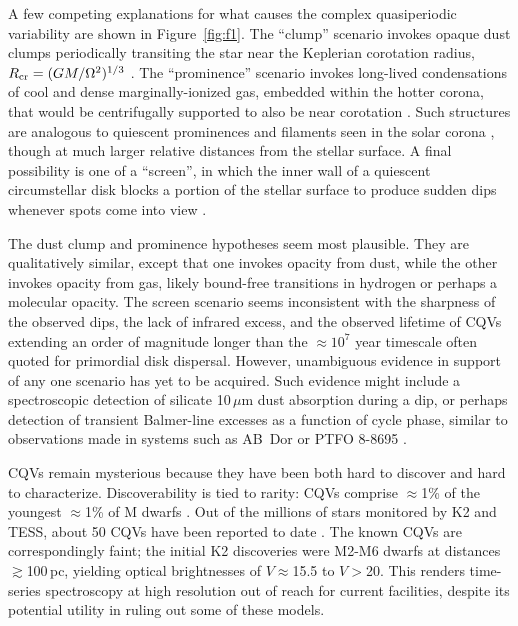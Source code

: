 \documentclass[11pt,twocolumn,tighten]{aastex63}
\begin{document}
A few competing explanations for what causes the complex quasiperiodic
variability are shown in Figure~\ref{fig:f1}.  The ``clump'' scenario
invokes opaque dust clumps periodically transiting the star near the
Keplerian corotation radius, $R_{\rm cr} = (GM/\Omega^2)^{1/3}$
\citep{2017AJ....153..152S,2023MNRAS.518.4734S}.  The ``prominence''
scenario invokes long-lived condensations of cool and dense
marginally-ionized gas, embedded within the hotter corona, that would
be centrifugally supported to also be near corotation
\citep{1989MNRAS.238..657C,2019MNRAS.482.2853J,2022MNRAS.514.5465W}.
Such structures are analogous to quiescent prominences and filaments
seen in the solar corona \citep[see e.g.][]{2015ASSL..415.....V},
though at much larger relative distances from the stellar surface.  A
final possibility is one of a ``screen'', in which the inner wall of a
quiescent circumstellar disk blocks a portion of the stellar surface
to produce sudden dips whenever spots come into view
\citep{2019ApJ...876..127Z}.  

The dust clump and prominence hypotheses seem most plausible.  They
are qualitatively similar, except that one invokes opacity from dust,
while the other invokes opacity from gas, likely bound-free
transitions in hydrogen or perhaps a molecular opacity.  The screen
scenario seems inconsistent with the sharpness of the observed dips,
the lack of infrared excess, and the observed lifetime of CQVs
extending an order of magnitude longer than the $\approx$$10^7$ year
timescale often quoted for primordial disk dispersal.  However,
unambiguous evidence in support of any one scenario has yet to be
acquired.  Such evidence might include a spectroscopic detection of
silicate 10\,$\mu$m dust absorption during a dip, or perhaps detection
of transient Balmer-line excesses as a function of cycle phase,
similar to observations made in systems such as AB~Dor
\citep[see][]{1999ASPC..158..146C} or PTFO 8-8695
\citep{2016ApJ...830...15J}.

CQVs remain mysterious because they have been both hard to discover
and hard to characterize.   Discoverability is tied to rarity: CQVs
comprise $\approx$1\% of the youngest $\approx$1\% of M dwarfs
\citep{2018AJ....155..196R}.  Out of the millions of stars monitored
by K2 and TESS, about 50 CQVs have been reported to date
\citep{2016AJ....152..114R,2017AJ....153..152S,2018AJ....155...63S,2019ApJ...876..127Z,2020AJ....160...86B,2022AJ....163..144G,2023ApJ...945..114P}.
The known CQVs are correspondingly faint; the initial K2 discoveries
\citep{2016AJ....152..114R,2017AJ....153..152S} were M2-M6 dwarfs at
distances $\gtrsim$100\,pc, yielding optical brightnesses of
$V$$\approx$15.5 to $V$$>$20.  This renders time-series spectroscopy
at high resolution out of reach for current facilities, despite its
potential utility in ruling out some of these models.
\end{document}
